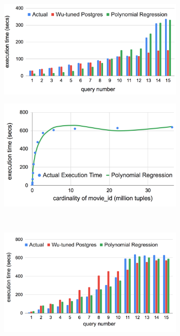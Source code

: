\documentclass{article}
\begin{document}
\begin{figure}
\begin{subfigure}{.5\linewidth}
	\label{fig:corrminus1_train}
\end{subfigure}
~
\begin{subfigure}{.5\linewidth}
	\includegraphics[scale=0.37]{./figs/exp/8/b.png}
	\label{fig:corrminus1_test}
\end{subfigure}
\medskip
\begin{subfigure}{.5\linewidth}
	\hspace{-2em}
	\includegraphics[scale=0.39]{./figs/exp/7/c.png}
	\label{fig:corr0_train}
\end{subfigure}
~
\begin{subfigure}{.5\linewidth}
	\includegraphics[scale=0.36]{./figs/exp/8/c.png}

\end{subfigure}
\end{figure}
\end{document}
